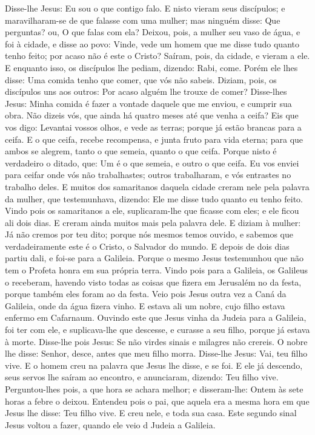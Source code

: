 {Disse-lhe Jesus: Eu sou o que contigo falo.
E nisto vieram seus discípulos; e maravilharam-se de que falasse com uma mulher; mas ninguém
{} disse: Que perguntas? ou, O que falas com ela?
Deixou, pois, a mulher seu vaso de água, e foi à cidade, e disse ao povo:
Vinde, vede um homem que me disse tudo quanto tenho feito; por acaso não é este o Cristo?
Saíram, pois, da cidade, e vieram a ele.
E enquanto isso, os discípulos lhe pediam, dizendo: Rabi, come.
Porém ele lhes disse: Uma comida tenho que comer, que vós não sabeis.
Diziam, pois, os discípulos uns aos outros: Por acaso alguém lhe trouxe de comer?
Disse-lhes Jesus: Minha comida é fazer a vontade daquele que me enviou, e cumprir sua obra.
Não dizeis vós, que ainda há quatro meses até que venha a ceifa? Eis que vos digo: Levantai vossos olhos, e vede as terras; porque já estão brancas para a ceifa.
E o que ceifa, recebe recompensa, e junta fruto para vida eterna; para que ambos se alegrem, tanto o que semeia, quanto o que ceifa.
Porque nisto é verdadeiro o ditado, que: Um é o que semeia, e outro o que ceifa.
Eu vos enviei para ceifar onde vós não trabalhastes; outros trabalharam, e vós entrastes no trabalho deles.
E muitos dos samaritanos daquela cidade creram nele pela palavra da mulher, que testemunhava, dizendo: Ele me disse tudo quanto eu tenho feito.
Vindo pois os samaritanos a ele, suplicaram-lhe que ficasse com eles; e ele ficou ali dois dias.
E creram ainda muitos mais pela palavra dele.
E diziam à mulher: Já não cremos por teu dito; porque nós mesmos temos
{} ouvido, e sabemos que verdadeiramente este é o Cristo, o Salvador do mundo.
E depois de dois dias partiu dali, e foi-se para a Galileia.
Porque o mesmo Jesus testemunhou que não tem o Profeta honra em sua própria terra.
Vindo pois para a Galileia, os Galileus o receberam, havendo visto todas as coisas que fizera em Jerusalém no
{} da festa, porque também eles foram ao
{} da festa.
Veio pois Jesus outra vez a Caná da Galileia, onde da água fizera vinho. E estava ali um nobre, cujo filho estava enfermo em Cafarnaum.
Ouvindo este que Jesus vinha da Judeia para a Galileia, foi ter com ele, e suplicava-lhe que descesse, e curasse a seu filho, porque já estava à morte.
Disse-lhe pois Jesus: Se não virdes sinais e milagres não crereis.
O nobre lhe disse: Senhor, desce, antes que meu filho morra.
Disse-lhe Jesus: Vai, teu filho vive. E o homem creu na palavra que Jesus lhe disse, e se foi.
E
{} ele já descendo, seus servos lhe saíram ao encontro, e
{} anunciaram, dizendo: Teu filho vive.
Perguntou-lhes pois, a que hora se achara melhor; e disseram-lhe: Ontem às sete horas a febre o deixou.
Entendeu pois o pai, que aquela era a mesma hora em que Jesus lhe disse: Teu filho vive. E creu nele, e toda sua casa.
Este segundo sinal Jesus voltou a fazer, quando ele veio d
{} Judeia a Galileia.

}
